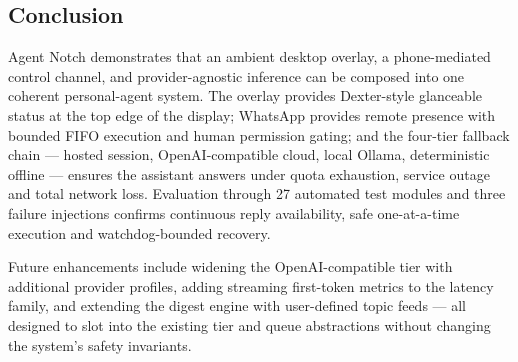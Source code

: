 \documentclass[conference]{IEEEtran}
\begin{document}
\subsection{Conclusion}

Agent Notch demonstrates that an ambient desktop overlay, a
phone-mediated control channel, and provider-agnostic inference
can be composed into one coherent personal-agent system. The
overlay provides Dexter-style glanceable status at the top edge
of the display; WhatsApp provides remote presence with bounded
FIFO execution and human permission gating; and the four-tier
fallback chain --- hosted session, OpenAI-compatible cloud,
local Ollama, deterministic offline --- ensures the assistant
answers under quota exhaustion, service outage and total
network loss. Evaluation through 27 automated test modules and
three failure injections confirms continuous reply availability,
safe one-at-a-time execution and watchdog-bounded recovery.

Future enhancements include widening the OpenAI-compatible tier
with additional provider profiles, adding streaming first-token
metrics to the latency family, and extending the digest engine
with user-defined topic feeds --- all designed to slot into the
existing tier and queue abstractions without changing the
system's safety invariants.
\end{document}
